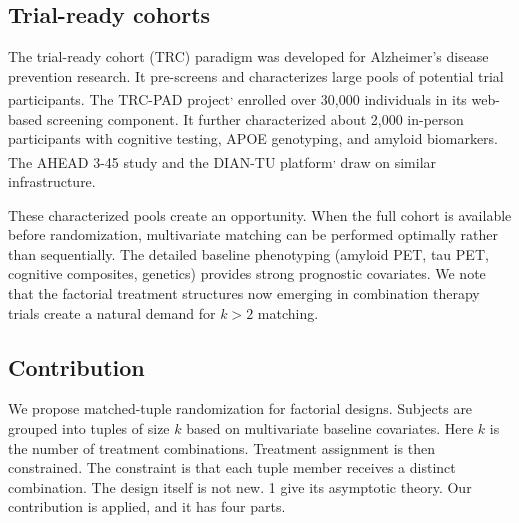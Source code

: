 \documentclass[
  11pt,
]{article}
\begin{document}
\subsection{Trial-ready cohorts}\label{trial-ready-cohorts}

The trial-ready cohort (TRC) paradigm was developed for
Alzheimer's disease prevention research. It pre-screens and
characterizes large pools of potential trial participants.
The TRC-PAD project\textsuperscript{,} enrolled over 30,000 individuals
in its web-based screening component. It further
characterized about 2,000 in-person participants with
cognitive testing, APOE genotyping, and amyloid biomarkers.
The AHEAD 3-45 study\textsuperscript{} and the DIAN-TU
platform\textsuperscript{,} draw on
similar infrastructure.

These characterized pools create an opportunity. When the full
cohort is available before randomization, multivariate
matching can be performed optimally rather than sequentially.
The detailed baseline phenotyping (amyloid PET, tau PET,
cognitive composites, genetics) provides strong prognostic
covariates. We note that the factorial treatment structures
now emerging in combination therapy trials create a natural
demand for \(k > 2\) matching.

\subsection{Contribution}\label{contribution}

We propose matched-tuple randomization for factorial designs.
Subjects are grouped into tuples of size \(k\) based on
multivariate baseline covariates. Here \(k\) is the number of
treatment combinations. Treatment assignment is then
constrained. The constraint is that each tuple member
receives a distinct combination. The design itself is not
new. 1 give its asymptotic theory. Our
contribution is applied, and it has four parts.
\end{document}
